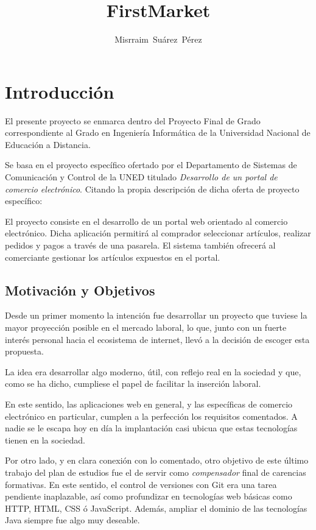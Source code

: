 \documentclass[a4paper]{report}
\author{Misrraim~Su\'arez~P\'erez}
\title{FirstMarket}
\begin{document}
    \maketitle
    \tableofcontents

    \section{Introducción}
    El presente proyecto se enmarca dentro del Proyecto Final de Grado correspondiente al Grado en Ingeniería Informática
    de la Universidad Nacional de Educación a Distancia.

    Se basa en el proyecto específico ofertado por el Departamento de Sistemas de Comunicación y Control de la UNED titulado \emph{Desarrollo de un portal de comercio electrónico}.
    Citando la propia descripción de dicha oferta de proyecto específico:
    \begin{displayquote}
        El proyecto consiste en el desarrollo de un portal web orientado al comercio electrónico.
        Dicha aplicación permitirá al comprador seleccionar artículos, realizar pedidos y pagos a través de una pasarela.
        El sistema también ofrecerá al comerciante gestionar los artículos expuestos en el portal.
    \end{displayquote}


    \subsection{Motivación y Objetivos}
    Desde un primer momento la intención fue desarrollar un proyecto que tuviese la mayor proyección posible en el mercado laboral, lo que,
    junto con un fuerte interés personal hacia el ecosistema de internet, llevó a la decisión de escoger esta propuesta.

    La idea era desarrollar algo moderno, útil, con reflejo real en la sociedad y que, como se ha dicho, cumpliese el papel de facilitar la inserción laboral.

    En este sentido, las aplicaciones web en general, y las específicas de comercio electrónico en particular, cumplen a la perfección los requisitos comentados.
    A nadie se le escapa hoy en día la implantación casi ubicua que estas tecnologías tienen en la sociedad.

    Por otro lado, y en clara conexión con lo comentado, otro objetivo de este último trabajo del plan de estudios fue el de servir como \emph{compensador} final de carencias formativas.
    En este sentido, el control de versiones con Git era una tarea pendiente inaplazable, así como profundizar en tecnologías web básicas como HTTP, HTML, CSS ó JavaScript.
    Además, ampliar el dominio de las tecnologías Java siempre fue algo muy deseable.
\end{document}
